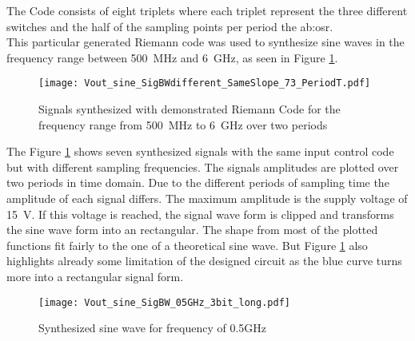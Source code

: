  The Code consists of eight triplets where each triplet represent the three different switches and the half of the sampling points per period the \gls{ab:osr}.\\ 
This particular generated Riemann code was used to synthesize sine waves in the frequency range between \SI{500}{\MHz} and \SI{6}{\GHz}, as seen in Figure \ref{fig:7SignalsSameSlopeInOnePlot}.

\begin{figure}[htb!]
   \hspace{.8cm}
   \texttt{[image: Vout\_sine\_SigBWdifferent\_SameSlope\_73\_PeriodT.pdf]}
   \caption{Signals synthesized with demonstrated Riemann Code for the frequency range from \SI{500}{\MHz} to \SI{6}{\GHz} over two periods}
   \label{fig:7SignalsSameSlopeInOnePlot}
\end{figure}

The Figure \ref{fig:7SignalsSameSlopeInOnePlot} shows seven synthesized signals with the same input control code but with different sampling frequencies. 
The signals amplitudes are plotted over two periods in time domain.
Due to the different periods of sampling time the amplitude of each signal differs.
The maximum amplitude is the supply voltage of \SI{15}{\volt}. 
If this voltage is reached, the signal wave form is clipped and transforms the sine wave form into an rectangular.
The shape from most of the plotted functions fit fairly to the one of a theoretical sine wave.
But Figure \ref{fig:7SignalsSameSlopeInOnePlot} also highlights already some limitation of the designed circuit as the blue curve turns more into a rectangular signal form.\\

\begin{figure}[htb!]
   \centering
   \texttt{[image: Vout\_sine\_SigBW\_05GHz\_3bit\_long.pdf]}
   \caption{Synthesized sine wave for frequency of 0.5GHz}
   \label{fig:SineWave05GHz}
\end{figure}

